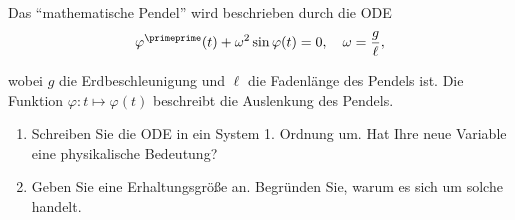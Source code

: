 \begin{exercise}

Das \enquote{mathematische Pendel} wird beschrieben durch die ODE
\begin{align*}
  \varphi^\primeprime(t) + \omega^2 \sin{\varphi(t)} = 0,
  \quad
  \omega = \frac{g}{\ell},
\end{align*}

wobei $g$ die Erdbeschleunigung und $\ell$ die Fadenlänge des Pendels ist. Die Funktion $\varphi: t \mapsto \varphi(t)$ beschreibt die Auslenkung des Pendels.

\begin{enumerate}[label = \textbf{\alph*)}]

  \item Schreiben Sie die ODE in ein System 1. Ordnung um. Hat Ihre neue Variable eine physikalische
  Bedeutung?

  \item Geben Sie eine Erhaltungsgröße an. Begründen Sie, warum es sich um solche handelt.

\end{enumerate}

\end{exercise}

